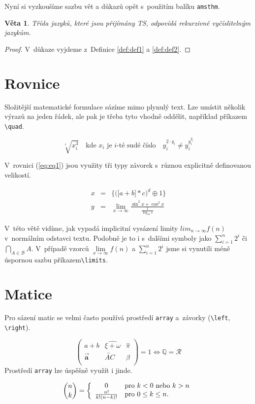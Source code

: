 \documentclass[11pt, a4paper,twocolumn]{article}
\newtheorem{theorem}{Věta}
\begin{document}
Nyní si vyzkoušíme sazbu vět a důkazů opět s~použitím balíku \texttt{amsthm}.

\begin{theorem}
Třída jazyků, které jsou přijímány TS, odpovídá \textnormal{rekurzivně vyčíslitelným jazykům.}
\end{theorem}

\begin{proof}
V~důkaze vyjdeme z~Definice \ref{def:def1} a \ref{def:def2}.
\end{proof}

\section{Rovnice}
Složitější matematické formulace sázíme mimo plynulý text. Lze umístit několik výrazů na jeden řádek, ale pak je třeba tyto vhodně oddělit, například příkazem \verb|\quad|.

$$
\sqrt[i]{x_i^{3}}
   \quad \text{kde $x_i$ je $i$-té sudé číslo} \quad 
y_i^{2\cdot y_i} \neq y_i^{y_i^{y_i}}
$$

V~rovnici (\ref{eq:eq1}) jsou využity tři typy závorek s~různou explicitně definovanou velikostí.

\begin{eqnarray} 
x & = & \Bigg\{ \bigg( \big[a+b\big]\ast c \bigg)^d \oplus 1 \Bigg\} \label{eq:eq1} \\ 
y & = & \lim_{x \to \infty}\frac{\sin^2 x + \cos^2 x}{\frac{1}{\log_{10} x}} \label{eq:eq2}
\end{eqnarray}

V~této větě vidíme, jak vypadá implicitní vysázení limity $lim_{n \to \infty} f(n)$ v~normálním odstavci textu. Podobně je to i s~dalšími symboly jako $\sum_{i=1}^n 2^i$ či $\bigcap_{A \in \mathcal{B}} A$. V~případě vzorců $\lim\limits_{x \to \infty} f(n)$ a $\sum\limits_{i=1}^{n}2^i$ jsme si vynutili méně úspornou sazbu příkazem\verb|\limits|.

\section{Matice}
Pro sázení matic se velmi často používá prostředí \verb|array| a~závorky (\verb|\left|, \verb|\right|).

$$
\left( 
\begin{array}{ccc} 
    a+b & \widehat{\xi+\omega} & \hat{\pi} \\
    \vec{\mathbf{a}} & \overleftrightarrow{AC} & \beta \\
\end{array} \right)
= 1 \Longleftrightarrow \mathbb{Q} = \mathcal{R}
$$
Prostředí \verb|array| lze úspěšně využít i jinde.

$$
\binom{n}{k} = \left\{
\begin{array}{c l}
    0 & \text{pro } k < 0 \text{ nebo } k >n \\
    \frac{n!}{k!(n-k)!} & \text{pro } 0 \leq k \leq n.
\end{array}
\right.
$$
\end{document}
